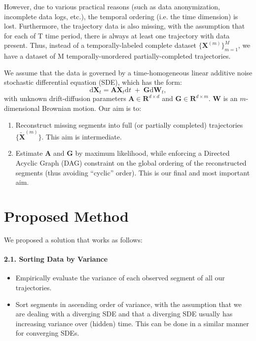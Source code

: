 \documentclass[a4paper, 11pt]{article}
\begin{document}
\begin{sloppypar}
However, due to various practical reasons (such as data anonymization, 
incomplete data logs, etc.), the temporal ordering (i.e. the time dimension) is lost.
Furthermore, the trajectory data is also missing, with the assumption that for each of
T time period, there is always at least one trajectory with data present. Thus, instead
of a temporally-labeled complete dataset $\{\mathbf{X}^{(m)}\}_{m=1}^M$,
we have a dataset of M temporally-unordered partially-completed trajectories.

We assume that the data is governed by a time-homogeneous linear additive noise stochastic
differential equation (SDE), which has the form:
\[
\mathrm{d}\mathbf{X}_t 
= 
\mathbf{A}\mathbf{X}_t\mathrm{d}t 
\;+\; 
\mathbf{G}\mathrm{d}\mathbf{W}_t,
\]
with unknown drift-diffusion parameters $\mathbf{A} \in \mathbf{R}^{d \times d}$ and
$\mathbf{G} \in \mathbf{R}^{d \times m}$. $\mathbf{W}$ is an $m$-dimensional Brownian motion.
Our aim is to:
\begin{enumerate}
\item Reconstruct missing segments into full (or partially completed) trajectories
$\{\widetilde{\mathbf{X}}^{(m)}\}$. This aim is intermediate.
\item Estimate $\mathbf{A}$ and $\mathbf{G}$ by maximum likelihood, while enforcing a Directed
Acyclic Graph (DAG) constraint on the global ordering of the reconstructed segments
(thus avoiding ``cyclic'' order). This is our final and most important aim.
\end{enumerate}

\section{Proposed Method}\label{s:2}
We proposed a solution that works as follows:

\paragraph{2.1. Sorting Data by Variance}
\begin{itemize}
  \item Empirically evaluate the variance of each observed segment of all
  our trajectories.
  \item Sort segments in ascending order of variance, with the assumption that we
  are dealing with a diverging SDE and that a diverging SDE usually has increasing
  variance over (hidden) time. This can be done in a similar manner for converging SDEs.
\end{itemize}


\end{sloppypar}
\end{document}
